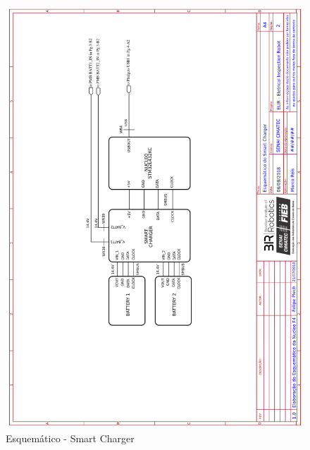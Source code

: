     \begin{figure}[h]
	\centering
	\includegraphics[width=14cm]{Figures/EsquematicoCHARGER.png}
	\caption{Esquemático - Smart Charger} \label{SmartCharger}
	\end{figure}
	
    \pagebreak
    
